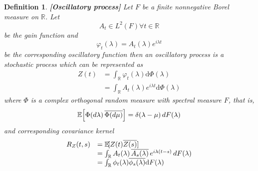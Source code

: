 \documentclass{article}
\newcommand{\mathd}{\mathrm{d}}
\newcommand{\tmem}[1]{{\em #1\/}}
\newcommand{\tmstrong}[1]{\textbf{#1}}
\newtheorem{definition}{Definition}
\begin{document}
\begin{definition}
  {\tmstrong{[Oscillatory process]\label{def:osc_proc} }}Let $F$ be a finite
  nonnegative Borel measure on $\mathbb{R}$. Let
  \begin{equation}
    A_t \in L^2 (F) \forall t \in \mathbb{R}
  \end{equation}
  be the gain function and
  \begin{equation}
    \varphi_t (\lambda) = A_t (\lambda) e^{i \lambda t} \label{of}
  \end{equation}
  be the corresponding oscillatory function then an {\tmem{oscillatory
  process}} is a stochastic process which can be represented as
  \begin{equation}
    \begin{array}{ll}
      Z (t) & = \int_{\mathbb{R}} \varphi_t (\lambda) \mathd \Phi (\lambda)\\
      & = \int_{\mathbb{R}} A_t (\lambda) e^{i \lambda t} \mathd \Phi
      (\lambda)
    \end{array}
  \end{equation}
  where $\Phi$ is a complex orthogonal random measure with spectral measure
  $F$, that is,
  \begin{equation}
    \mathbb{E} \hspace{-0.17em} \left[ \Phi (d \lambda) \hspace{0.17em}
    \overline{\Phi (d \mu)} \right] = \delta (\lambda - \mu)  \hspace{0.17em}
    dF (\lambda)
  \end{equation}
  and corresponding covariance kernel
  \begin{equation}
    \begin{array}{ll}
      R_Z (t, s) & =\mathbb{E} \hspace{-0.17em} [Z (t) \overline{Z (s)}]\\
      & = \int_{\mathbb{R}} A_t (\lambda) \hspace{0.17em} \overline{A_s
      (\lambda)} \hspace{0.17em} e^{i \lambda (t - s)}  \hspace{0.17em} dF
      (\lambda)\\
      & = \int_{\mathbb{R}} \phi_t (\lambda) \overline{\phi_s (\lambda)}
      \mathd F (\lambda)
    \end{array} \label{covar}
  \end{equation}
\end{definition}
\end{document}
